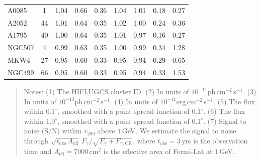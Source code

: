 \documentclass[10pt,aps,pra,reprint,amsmath,amsfonts,amssymb,showpacs,nofootinbib,floatfix]{revtex4-1}
\newcommand{\rmn}{\mathrm}
\newcommand{\cm}{\rmn{cm}}
\newcommand{\CR}{\rmn{CR}}
\newcommand{\rvir}{r_{200}}
\begin{document}
\begin{table}
\begin{minipage}{2.0\columnwidth}
\begin{tabular}{l c c c c c c c c}
A0085 & 1 & 1.04 & 0.66 & 0.36 & 1.04 & 1.01 & 0.18 & 0.27 \\
A2052 & 44 & 1.01 & 0.64 & 0.35 & 1.02 & 1.00 & 0.24 & 0.36 \\
A1795 & 40 & 1.00 & 0.64 & 0.35 & 1.01 & 0.97 & 0.16 & 0.27 \\
NGC507 & 4 & 0.99 & 0.63 & 0.35 & 1.00 & 0.99 & 0.34 & 1.28 \\
MKW4 & 27 & 0.95 & 0.60 & 0.33 & 0.95 & 0.94 & 0.29 & 0.65 \\
NGC499 & 66 & 0.95 & 0.60 & 0.33 & 0.95 & 0.94 & 0.33 & 1.53 \\
\hline
\hline
\end{tabular}
\begin{quote}
  Notes:
   (1) The HIFLUGCS cluster ID.
   (2) In units of $10^{-11} \rmn{ph}\,\rmn{cm}^{-2}\,\rmn{s}^{-1}$.
   (3) In units of $10^{-13} \rmn{ph}\,\rmn{cm}^{-2}\,\rmn{s}^{-1}$.
   (4) In units of $10^{-11} \rmn{erg}\,\rmn{cm}^{-2}\,\rmn{s}^{-1}$.
   (5) The flux within $0.1^\circ$, smoothed with a point spread function of $0.1^\circ$.
   (6) The flux within $1.0^\circ$, smoothed with a point spread function of $0.1^\circ$.
   (7) Signal to noise (S/N) within $\rvir$ above $1\,$GeV. We estimate the signal to
  noise through $\sqrt{t_\rmn{obs}\,A_\rmn{eff}}\,F_{\gamma}/\sqrt{F_{\gamma}+F_{\gamma,\CR}}$,
  where $t_\rmn{obs}=3\,$yrs is the observation time and $A_\rmn{eff} = 7000\,\cm^2$
    is the effective area of Fermi-Lat at $1\,$GeV.
  \label{tab:flux_tab_BM}
  \end{quote}
\end{minipage}
\end{table}
\end{document}
